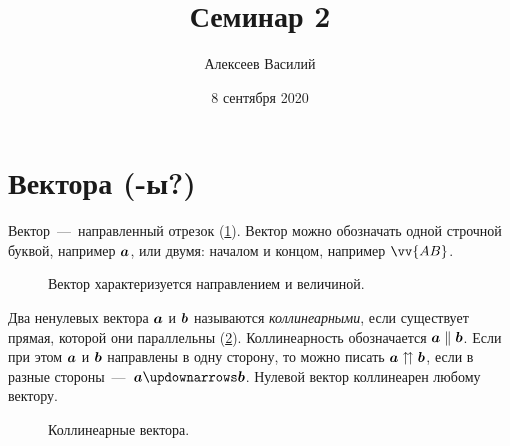 \documentclass[a4paper,12pt]{article}
\author{Алексеев Василий}
\title{Семинар 2}
\date{8 сентября 2020}
\begin{document}
  \maketitle
  
  \tableofcontents

  \thispagestyle{empty}
  
  \newpage
  


  \section{Вектора (-ы?)}
  
  Вектор~---~направленный отрезок (\ref{fig:vector}).
  Вектор можно обозначать одной строчной буквой, например $\boldsymbol a$, или двумя: началом и концом, например $\vv{AB}$.
  
  \begin{figure}[h]
    \centering
    
    
    \caption{Вектор характеризуется направлением и величиной.}
    \label{fig:vector}
  \end{figure}
  
  \begin{definition}[Коллинеарность]
    Два ненулевых вектора $\boldsymbol a$ и $\boldsymbol b$ называются \emph{коллинеарными}, если существует прямая, которой они параллельны (\ref{fig:collinearity}).
    Коллинеарность обозначается $\bds a \hm\parallel \bds b$.
    Если при этом $\boldsymbol a$ и $\boldsymbol b$ направлены в одну сторону, то можно писать $\bds a \hm\upuparrows \bds b$,
    если в разные стороны~---~$\bds a \hm\updownarrows \bds b$.
    Нулевой вектор коллинеарен любому вектору.
  \end{definition}
  
  \begin{figure}[h]
    \centering
    
    
    \caption{Коллинеарные вектора.}
    \label{fig:collinearity}
  \end{figure}
  
\end{document}
